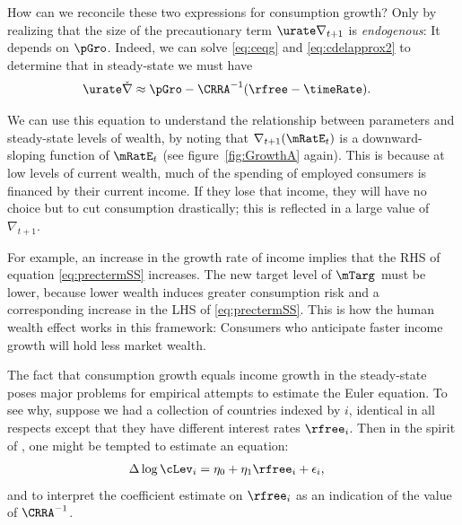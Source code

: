 \documentclass{handout}
\begin{document}
How can we reconcile these two expressions for consumption growth?
Only by realizing that the size of the precautionary term $\urate
\nabla_{t+1}$ is {\it endogenous}: It depends on $\pGro$.  Indeed, we
can solve \eqref{eq:ceqg} and \eqref{eq:cdelapprox2} to determine that
in steady-state we must have 
\begin{equation}\begin{gathered}\begin{aligned}
        \urate \check{\nabla} & \approx  \pGro - \CRRA^{-1}(\rfree-\timeRate). \label{eq:prectermSS}
\end{aligned}\end{gathered}\end{equation}

We can use this equation to understand the relationship between
parameters and steady-state levels of wealth, by noting that
$\nabla_{t+1}(\mRatE_{t})$ is a downward-sloping function of
$\mRatE_{t}$ (see figure~\ref{fig:GrowthA} again).  This is because at
low levels of current wealth, much of the spending of employed
consumers is financed by their current income.  If they lose that
income, they will have no choice but to cut consumption drastically; this is
reflected in a large value of $\nabla_{t+1}$.

For example, an increase in the growth rate of income implies that the
RHS of equation \eqref{eq:prectermSS} increases.  The new target level of
$\mTarg^{\null}$ must be lower, because lower wealth induces greater consumption risk and a corresponding increase in the LHS of \eqref{eq:prectermSS}.  This is how the human wealth effect works in this framework:
Consumers who anticipate faster income growth will hold less market wealth.

The fact that consumption growth equals income growth in the
steady-state poses major problems for empirical attempts to estimate
the Euler equation.  To see why, suppose we had a collection of
countries indexed by $i$, identical in all respects except that
they have different interest rates $\rfree_{i}$.
Then in the spirit of \cite{hallSubstitution}, one might be
tempted to estimate an equation:
\begin{equation}\begin{gathered}\begin{aligned}
        \Delta \log \cLev_{i} & =  \eta_{0} + \eta_{1} \rfree_{i}+\epsilon_{i},
\end{aligned}\end{gathered}\end{equation}
and to interpret the coefficient estimate on $\rfree_{i}$ as an indication
of the value of $\CRRA^{-1}$.
\end{document}
